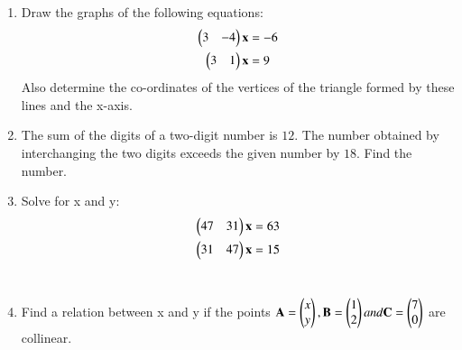 \renewcommand{\theequation}{\theenumi}
\begin{enumerate}[label=\thesection.\arabic*.,ref=\thesection.\theenumi]

\item Draw the graphs of the following equations: 
\begin{align}\label{linform/2006/2/11/eq:1}
    \begin{pmatrix}3&-4\end{pmatrix}\mathbf{x}&=-6
    \\
\label{linform/2006/2/11/eq:2}
    \begin{pmatrix}3&1\end{pmatrix}\mathbf{x}&=9
\end{align}Also determine the co-ordinates of the vertices of the triangle formed by these lines and the x-axis.
\\
\solution

\item The sum of the digits of a two-digit number is $12$. The number obtained by interchanging the two digits exceeds the given number by $18$. Find the number.
\\
\solution

\item Solve for x and y: 
\begin{align}
 \begin{pmatrix}47&31\end{pmatrix}\mathbf{x}&=63\\
 \begin{pmatrix}31&47\end{pmatrix}\mathbf{x}&=15 
\end{align} 
\\
\solution

 \item Find a relation between x and y if the points $\mathbf{A}=\begin{pmatrix}x\\y\end{pmatrix}, \mathbf{B}=\begin{pmatrix}1\\2\end{pmatrix} and \mathbf{C}=\begin{pmatrix}7\\0\end{pmatrix}$ are collinear.
 \\
 \solution
 
 
\end{enumerate}